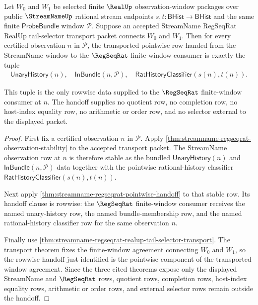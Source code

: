 \begin{theorem}
\label{thm:streamname-tail-selector-pointwise-transport}
Let $W_0$ and $W_1$ be selected finite $\RealUp$ observation-window packages
over public $\StreamNameUp$ rational stream endpoints
$s,t:\mathsf{BHist}\to\mathsf{BHist}$ and the same finite
$\mathsf{ProbeBundle}$ window $\mathcal P$. Suppose an accepted StreamName
RegSeqRat RealUp tail-selector transport packet connects $W_0$ and $W_1$. Then
for every certified observation $n$ in $\mathcal P$, the transported pointwise
row handed from the StreamName window to the $\RegSeqRat$ finite-window
consumer is exactly the tuple
$$
\begin{gathered}
\mathsf{UnaryHistory}(n),\quad
\mathsf{InBundle}(n,\mathcal P),\quad
\mathsf{RatHistoryClassifier}(s(n),t(n)).
\end{gathered}
$$

This tuple is the only rowwise data supplied to the $\RegSeqRat$ finite-window
consumer at $n$. The handoff supplies no quotient row, no completion row, no
host-index equality row, no arithmetic or order row, and no selector external
to the displayed packet.
\end{theorem}
\begin{proof}
First fix a certified observation $n$ in $\mathcal P$. Apply
\autoref{thm:streamname-regseqrat-observation-stability} to the accepted
transport packet. The StreamName observation row at $n$ is therefore stable as
the bundled $\mathsf{UnaryHistory}(n)$ and $\mathsf{InBundle}(n,\mathcal P)$
data together with the pointwise rational-history classifier
$\mathsf{RatHistoryClassifier}(s(n),t(n))$.

Next apply \autoref{thm:streamname-regseqrat-pointwise-handoff} to that stable
row. Its handoff clause is rowwise: the $\RegSeqRat$ finite-window consumer
receives the named unary-history row, the named bundle-membership row, and the
named rational-history classifier row for the same observation $n$.

Finally use
\autoref{thm:streamname-regseqrat-realup-tail-selector-transport}. The
transport theorem fixes the finite-window agreement connecting $W_0$ and
$W_1$, so the rowwise handoff just identified is the pointwise component of
the transported window agreement. Since the three cited theorems expose only
the displayed StreamName and $\RegSeqRat$ rows, quotient rows, completion rows,
host-index equality rows, arithmetic or order rows, and external selector rows
remain outside the handoff.
\end{proof}

